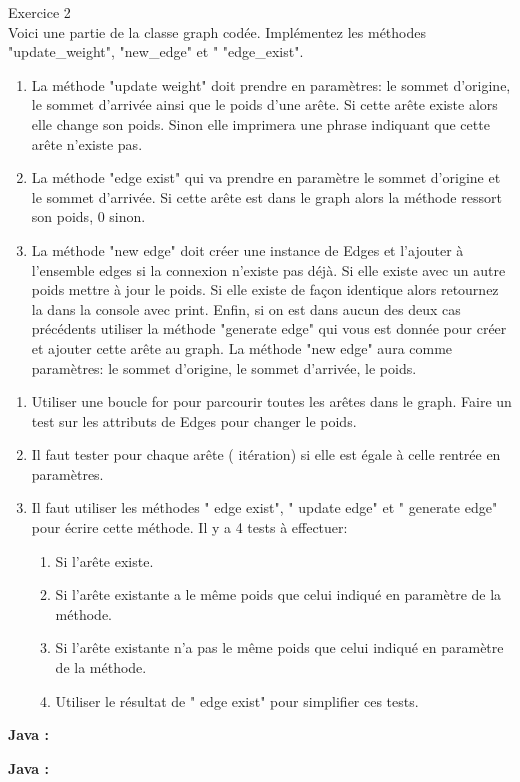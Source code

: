 \begin{Exercice} Exercice 2\\
Voici une partie de la classe graph codée. Implémentez les méthodes "update_weight", "new_edge" et " "edge_exist".
\endgroup
    \begin{enumerate}
        \item La méthode "update weight" doit prendre en paramètres: le sommet d'origine, le sommet d'arrivée ainsi que le poids d'une arête. Si cette arête existe alors elle change son poids. Sinon elle imprimera une phrase indiquant que cette arête n'existe pas.
        \item La méthode "edge exist" qui va prendre en paramètre le sommet d'origine et le sommet d'arrivée. Si cette arête est dans le graph alors la méthode ressort son poids, 0 sinon.
        \item La méthode "new edge" doit créer une instance de Edges et l'ajouter à l'ensemble edges si la connexion n'existe pas déjà. Si elle existe avec un autre poids mettre à jour le poids. Si elle existe de façon identique alors retournez la dans la console avec print. Enfin, si on est dans aucun des deux cas précédents utiliser la méthode "generate edge" qui vous est donnée pour créer et ajouter cette arête au graph. La méthode "new edge" aura comme paramètres: le sommet d'origine, le sommet d'arrivée, le poids.
    \end{enumerate}

    \begin{conseil}
    \begin{enumerate}
    \item Utiliser une boucle for pour parcourir toutes les arêtes dans le graph. Faire un test sur les attributs de Edges pour changer le poids.
    \item Il faut tester pour chaque arête ( itération) si elle  est égale à celle rentrée en paramètres.
    \item Il faut utiliser les méthodes " edge exist", " update edge" et " generate edge" pour écrire cette méthode. Il y a 4 tests à effectuer: 
        \begin{enumerate}
        \item Si l'arête existe.
        \item Si l'arête existante a le même poids que celui indiqué en paramètre de la méthode.
        \item Si l'arête existante n'a pas le même poids que celui indiqué en paramètre de la méthode.
        \item Utiliser le résultat de " edge exist" pour simplifier ces tests.
        \end{enumerate}
    \end{enumerate}
    \end{conseil}
    \begin{solution}
    \textbf{Java :}
         
    \end{solution}
    \begin{solution}
    \textbf{Java :}
         
    \end{solution}
    \end{Exercice}

